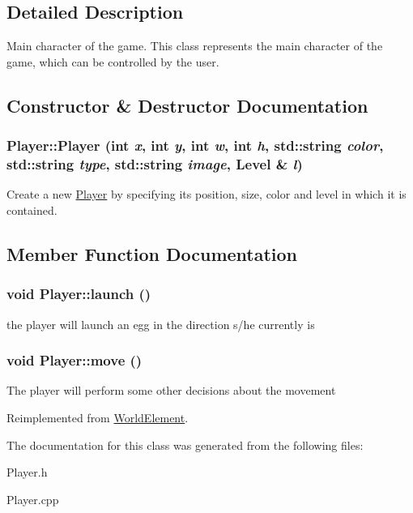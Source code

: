 \subsection{Detailed Description}
Main character of the game. This class represents the main character of the game, which can be controlled by the user. 

\subsection{Constructor \& Destructor Documentation}
\hypertarget{classPlayer_ae3c70b075d5da30ada86473920ddbb2d}{
\subsubsection[{Player}]{\setlength{\rightskip}{0pt plus 5cm}Player::Player (int {\em x}, \/  int {\em y}, \/  int {\em w}, \/  int {\em h}, \/  std::string {\em color}, \/  std::string {\em type}, \/  std::string {\em image}, \/  {\bf Level} \& {\em l})}}
\label{classPlayer_ae3c70b075d5da30ada86473920ddbb2d}
Create a new \hyperlink{classPlayer}{Player} by specifying its position, size, color and level in which it is contained. 

\subsection{Member Function Documentation}
\hypertarget{classPlayer_a4fe8735a8d96bee2227f9c175c860429}{
\subsubsection[{launch}]{\setlength{\rightskip}{0pt plus 5cm}void Player::launch ()}}
\label{classPlayer_a4fe8735a8d96bee2227f9c175c860429}
the player will launch an egg in the direction s/he currently is \hypertarget{classPlayer_ae02ee46d8c20dd0697b975f935b09839}{
\subsubsection[{move}]{\setlength{\rightskip}{0pt plus 5cm}void Player::move ()}}
\label{classPlayer_ae02ee46d8c20dd0697b975f935b09839}
The player will perform some other decisions about the movement 

Reimplemented from \hyperlink{classWorldElement}{WorldElement}.

The documentation for this class was generated from the following files:\begin{DoxyCompactItemize}
\item 
Player.h\item 
Player.cpp\end{DoxyCompactItemize}
